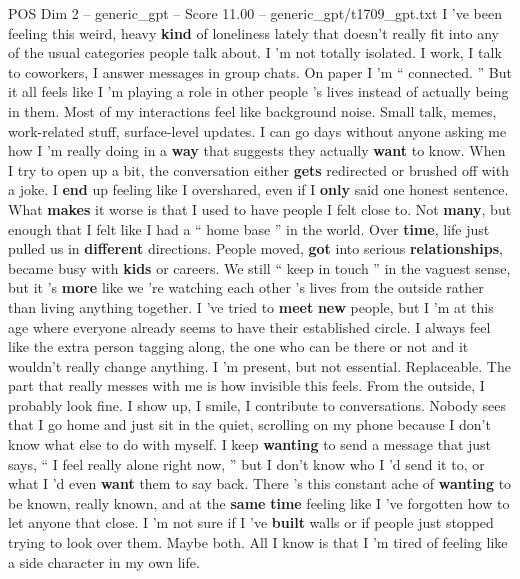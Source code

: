 \begin{textsample}{POS Dim 2 – generic\_gpt – Score 11.00 – generic\_gpt/t1709\_gpt.txt}  \label{ex:f2_pos_036}
I ’ve been feeling this weird, heavy \textbf{kind} of loneliness lately that doesn't really fit into any of the usual categories people talk about.
I ’m not totally isolated.
I work, I talk to coworkers, I answer messages in group chats.
On paper I ’m “ connected. ” But it all feels like I ’m playing a role in other people ’s lives instead of actually being in them.
Most of my interactions feel like background noise.
Small talk, memes, work-related stuff, surface-level updates.
I can go days without anyone asking me how I ’m really doing in a \textbf{way} that suggests they actually \textbf{want} to know.
When I try to open up a bit, the conversation either \textbf{gets} redirected or brushed off with a joke.
I \textbf{end} up feeling like I overshared, even if I \textbf{only} said one honest sentence.
What \textbf{makes} it worse is that I used to have people I felt close to.
Not \textbf{many}, but enough that I felt like I had a “ home base ” in the world.
Over \textbf{time}, life just pulled us in \textbf{different} directions.
People moved, \textbf{got} into serious \textbf{relationships}, became busy with \textbf{kids} or careers.
We still “ keep in touch ” in the vaguest sense, but it ’s \textbf{more} like we ’re watching each other ’s lives from the outside rather than living anything together.
I ’ve tried to \textbf{meet} \textbf{new} people, but I ’m at this age where everyone already seems to have their established circle.
I always feel like the extra person tagging along, the one who can be there or not and it wouldn't really change anything.
I ’m present, but not essential.
Replaceable.
The part that really messes with me is how invisible this feels.
From the outside, I probably look fine.
I show up, I smile, I contribute to conversations.
Nobody sees that I go home and just sit in the quiet, scrolling on my phone because I don't know what else to do with myself.
I keep \textbf{wanting} to send a message that just says, “ I feel really alone right now, ” but I don't know who I ’d send it to, or what I ’d even \textbf{want} them to say back.
There ’s this constant ache of \textbf{wanting} to be known, really known, and at the \textbf{same} \textbf{time} feeling like I ’ve forgotten how to let anyone that close.
I ’m not sure if I ’ve \textbf{built} walls or if people just stopped trying to look over them.
Maybe both.
All I know is that I ’m tired of feeling like a side character in my own life.

\end{textsample}
